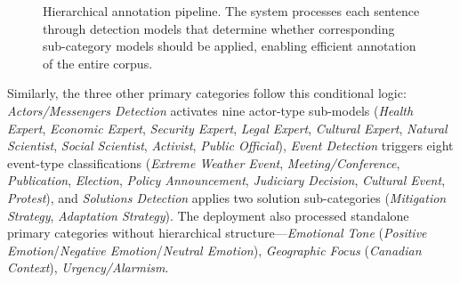 \documentclass[12pt]{article}
\renewcommand\_{\texttt{\detokenize{_}\allowbreak}}
\begin{document}
\begin{figure}[b!]
{
}
\caption{Hierarchical annotation pipeline. The system processes each sentence through detection models that determine whether corresponding sub-category models should be applied, enabling efficient annotation of the entire corpus.}
\label{fig:hierarchical_annotation}
\end{figure}

Similarly, the three other primary categories follow this conditional logic: \emph{Actors/Messengers Detection} activates nine actor-type sub-models (\emph{Health Expert}, \emph{Economic Expert}, \emph{Security Expert}, \emph{Legal Expert}, \emph{Cultural Expert}, \emph{Natural Scientist}, \emph{Social Scientist}, \emph{Activist}, \emph{Public Official}), \emph{Event Detection} triggers eight event-type classifications (\emph{Extreme Weather Event}, \emph{Meeting/Conference}, \emph{Publication}, \emph{Election}, \emph{Policy Announcement}, \emph{Judiciary Decision}, \emph{Cultural Event}, \emph{Protest}), and \emph{Solutions Detection} applies two solution sub-categories (\emph{Mitigation Strategy}, \emph{Adaptation Strategy}). The deployment also processed standalone primary categories without hierarchical structure—\emph{Emotional Tone} (\emph{Positive Emotion}/\emph{Negative Emotion}/\emph{Neutral Emotion}), \emph{Geographic Focus} (\emph{Canadian Context}), \emph{Urgency/Alarmism}. 
\end{document}
